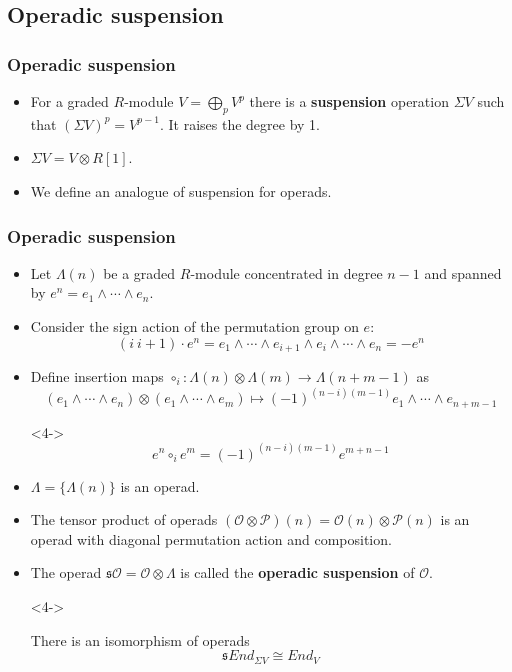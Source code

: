 \documentclass{beamer}
\theoremstyle{definition}
\begin{document}
\subsection{Operadic suspension}
\begin{frame}
\frametitle{Operadic suspension}
\begin{itemize}
\item<1-> For a graded $R$-module $V=\bigoplus_{p} V^p$ there is a \textbf{suspension} operation $\Sigma V$ such that $(\Sigma V)^p=V^{p-1}$. It raises the degree by 1.
\item<2-> $\Sigma V = V\otimes R[1]$.
\item<3-> We define an analogue of suspension for operads.
\end{itemize}
\end{frame}
\begin{frame}
\frametitle{Operadic suspension}

\begin{itemize}
\item<1-> Let $\Lambda(n)$ be a graded $R$-module concentrated in degree $n-1$ and spanned by $e^n=e_1\land\cdots\land e_n$. %
\item<2-> Consider the sign action of the permutation group on $e$:
\[(i\ i+1)\cdot e^n=e_1\land\cdots\land e_{i+1}\land e_i\land\cdots\land e_n=-e^n\]
\item<3-> Define insertion maps $\circ_i:\Lambda(n)\otimes\Lambda(m)\to\Lambda(n+m-1)$ as
\[(e_1\land\cdots\land e_n)\otimes(e_1\land\cdots\land e_m)\mapsto  (-1)^{(n-i)(m-1)}e_1\land\cdots\land e_{n+m-1}\]
\item[]<4-> \[e^n\circ_i e^m= (-1)^{(n-i)(m-1)}e^{m+n-1}\]
\end{itemize}
\end{frame}

\begin{frame}
\begin{itemize}
\item<1-> $\Lambda=\{\Lambda(n)\}$ is an operad.
\item<2-> The tensor product of operads $(\mathcal{O}\otimes \mathcal{P})(n)=\mathcal{O}(n)\otimes \mathcal{P}(n)$ is an operad with diagonal permutation action and composition. %
\item<3-> The operad $\mathfrak{s}\mathcal{O}=\mathcal{O}\otimes\Lambda$ is called the \textbf{operadic suspension} of $\mathcal{O}$.

\item[]<4-> \begin{theorem}[Markl]
There is an isomorphism of operads
\[ \mathfrak{s}End_{\Sigma V}\cong End_V\]
\end{theorem}

\end{itemize}
\end{frame}
\end{document}
